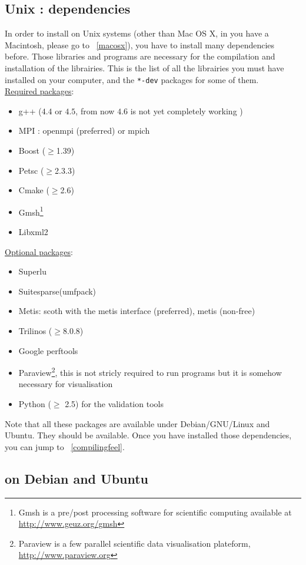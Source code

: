 \subsection{Unix : dependencies}
\label{sec:about-dependencies}

In order to install \feel on Unix systems (other than Mac OS X, in you have a Macintosh, please go to ~\ref{macosx}), you have to install many dependencies
before. Those libraries and programs are necessary for the
compilation and installation of the \feel librairies.
This is the list of all the librairies you must have installed on your
computer, and the \lstinline|*-dev| packages for some of them. \\
\underline{Required packages}:
\begin{itemize}
\item g++ ($4.4$ or $4.5$, from now $4.6$ is not yet	completely working  )
\item MPI : openmpi (preferred) or mpich
\item Boost ($\geq$1.39)
\item Petsc ($\geq$2.3.3)
\item Cmake ($\geq$2.6)
\item Gmsh\footnote{Gmsh is a pre/post processing software for scientific
computing available at \url{http://www.geuz.org/gmsh}}
\item Libxml2
\end{itemize}
\underline{Optional packages}:
\begin{itemize}
\item Superlu
\item Suitesparse(umfpack)
\item Metis: scoth with the metis interface (preferred), metis (non-free)
\item Trilinos ($\geq$8.0.8)
\item Google perftools
\item Paraview\footnote{Paraview is a few parallel scientific data
    visualisation plateform, \url{http://www.paraview.org}}, this is
  not stricly required to run \feel programs but it is somehow
  necessary for visualisation
\item Python ($\geq$ 2.5) for the validation tools
\end{itemize}
Note that all these packages are available under Debian/GNU/Linux and
Ubuntu. They should be available. Once you have installed those dependencies, you can jump to ~\ref{compilingfeel}.

\subsection{\feel on Debian and Ubuntu}
\label{sec:feel-debian-ubuntu}

